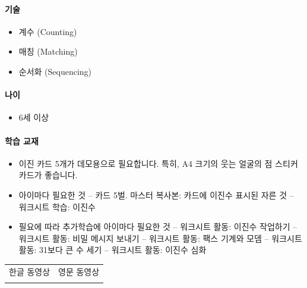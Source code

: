 \documentclass[]{article}
\begin{document}
\mbox{}\paragraph{기술}\label{section-7}

\begin{itemize}
\itemsep1pt\parskip0pt
\item
  계수 (Counting)
\item
  매칭 (Matching)
\item
  순서화 (Sequencing)
\end{itemize}

\mbox{}\paragraph{나이}\label{section-8}

\begin{itemize}
\itemsep1pt\parskip0pt
\item
  6세 이상
\end{itemize}

\mbox{}\paragraph{학습 교재}\label{section-9}

\begin{itemize}
\itemsep1pt\parskip0pt
\item
  이진 카드 5개가 데모용으로 필요합니다. 특히, A4 크기의 웃는 얼굴의 점
  스티커 카드가 좋습니다.
\item
  아이마다 필요한 것 -- 카드 5벌. 마스터 복사본: 카드에 이진수 표시된
  자른 것 -- 워크시트 학습: 이진수
\item
  필요에 따라 추가학습에 아이마다 필요한 것 -- 워크시트 활동: 이진수
  작업하기 -- 워크시트 활동: 비밀 메시지 보내기 -- 워크시트 활동: 팩스
  기계와 모뎀 -- 워크시트 활동: 31보다 큰 수 세기 -- 워크시트 활동:
  이진수 심화
\end{itemize}


\begin{longtable}[c]{@{}ll@{}}
\toprule
\begin{minipage}[t]{0.47\columnwidth}\raggedright\strut
한글 동영상
\strut\end{minipage} &
\begin{minipage}[t]{0.47\columnwidth}\raggedright\strut
영문 동영상
\strut\end{minipage}\tabularnewline
\begin{minipage}[t]{0.47\columnwidth}\raggedright\strut
\strut\end{minipage} &
\begin{minipage}[t]{0.47\columnwidth}\raggedright\strut
\strut\end{minipage}\tabularnewline
\bottomrule
\end{longtable}
\end{document}
